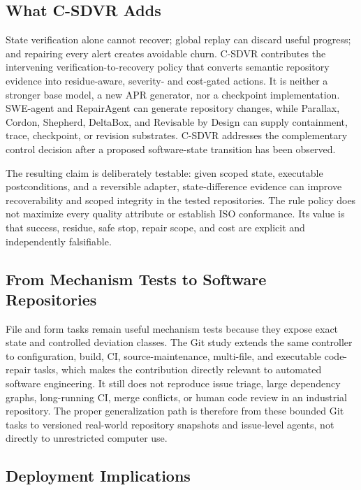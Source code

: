 \documentclass[pdflatex,sn-apa]{sn-jnl}
\begin{document}
\subsection{What C-SDVR Adds}

State verification alone cannot recover; global replay can discard useful progress; and repairing every alert creates avoidable churn. C-SDVR contributes the intervening verification-to-recovery policy that converts semantic repository evidence into residue-aware, severity- and cost-gated actions. It is neither a stronger base model, a new APR generator, nor a checkpoint implementation. SWE-agent and RepairAgent can generate repository changes, while Parallax, Cordon, Shepherd, DeltaBox, and Revisable by Design can supply containment, trace, checkpoint, or revision substrates. C-SDVR addresses the complementary control decision after a proposed software-state transition has been observed.

The resulting claim is deliberately testable: given scoped state, executable postconditions, and a reversible adapter, state-difference evidence can improve recoverability and scoped integrity in the tested repositories. The rule policy does not maximize every quality attribute or establish ISO conformance. Its value is that success, residue, safe stop, repair scope, and cost are explicit and independently falsifiable.

\subsection{From Mechanism Tests to Software Repositories}

File and form tasks remain useful mechanism tests because they expose exact state and controlled deviation classes. The Git study extends the same controller to configuration, build, CI, source-maintenance, multi-file, and executable code-repair tasks, which makes the contribution directly relevant to automated software engineering. It still does not reproduce issue triage, large dependency graphs, long-running CI, merge conflicts, or human code review in an industrial repository. The proper generalization path is therefore from these bounded Git tasks to versioned real-world repository snapshots and issue-level agents, not directly to unrestricted computer use.

\subsection{Deployment Implications}
\end{document}
